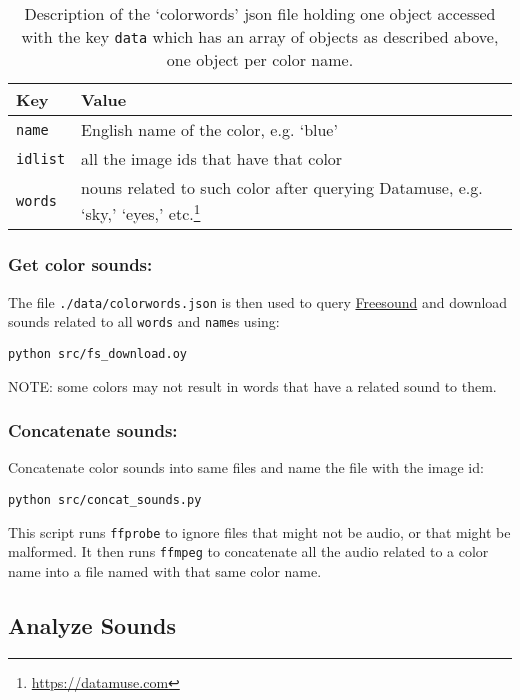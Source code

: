 \begin{table}
\begin{tabular}{l | l}

Key     & Value

\tabularnewline
\hline


\texttt{name}    & English name of the color, e.g. `blue'

\tabularnewline
\hline

\texttt{idlist}  & all the image ids that have that color

\tabularnewline
\hline

\texttt{words}   & nouns related to such color after querying Datamuse, e.g. `sky,' `eyes,' etc.\footnote{\url{https://datamuse.com}} 

\end{tabular}
\label{tab:colorwords}
\caption{Description of the `colorwords' \gls{json} file holding one object accessed with the key \texttt{data} which has an array of objects as described above, one object per color name.}
\end{table}


\subsubsection{Get color sounds:}

The file \texttt{./data/colorwords.json} is then used to query \href{https://freesound.org}{Freesound} and download sounds related to all \texttt{words} and \texttt{name}s using:

\texttt{python\ src/fs\_download.oy}

NOTE: some colors may not result in words that have a related sound to them.


\subsubsection{Concatenate sounds:}

Concatenate color sounds into same files and name the file with the image id:

\texttt{python\ src/concat\_sounds.py}

This script runs \texttt{ffprobe} to ignore files that might not be audio, or that might be malformed. It then runs \texttt{ffmpeg} to concatenate all the audio related to a color name into a file named with that same color name.




\subsection{Analyze Sounds}

